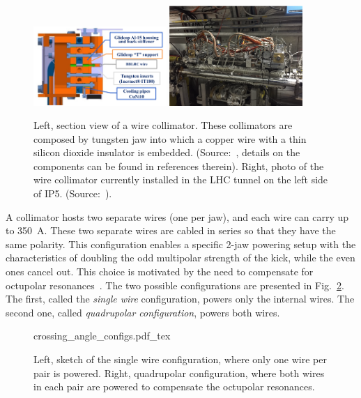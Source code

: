 \begin{figure}
    \centering
    \includegraphics[width=0.45\textwidth]{5_wire_compensators_LHC/figs/wire_real_2.png}
    \includegraphics[width=0.45\textwidth]{5_wire_compensators_LHC/figs/wire_real_1.png}
    \caption{Left, section view of a wire collimator. These  collimators are composed by tungsten jaw into which a copper wire with a thin silicon dioxide insulator is embedded. (Source:~\cite{Rossi:2696270}, details on the components can be found in references therein). Right, photo of the wire collimator currently installed in the LHC tunnel on the left side of IP5. (Source:~\cite{axel.wires}).}
    \label{fig:wire_compensator_photo}
\end{figure}

A collimator hosts two separate wires (one per jaw), and each wire can carry up to \SI{350}{\ampere}. These two separate wires are cabled in series so that they have the same polarity. This configuration enables a specific 2-jaw powering setup with the characteristics of doubling the odd multipolar strength of the kick, while the even ones cancel out. This choice is motivated by the need to compensate for octupolar resonances~\cite{Poyet:2703503}. The two possible configurations are presented in Fig.~\ref{fig:wire-configs}. The first, called the \textit{single wire} configuration, powers only the internal wires. The second one, called \textit{quadrupolar configuration}, powers both wires.

\begin{figure}[hpt]
    \centering
    \def\svgwidth{1.0\textwidth}
    {crossing_angle_configs.pdf_tex}
    \caption{Left, sketch of the single wire configuration, where only one wire per pair is powered. Right, quadrupolar configuration, where both wires in each pair are powered to compensate the octupolar resonances.}
    \label{fig:wire-configs}
\end{figure}

